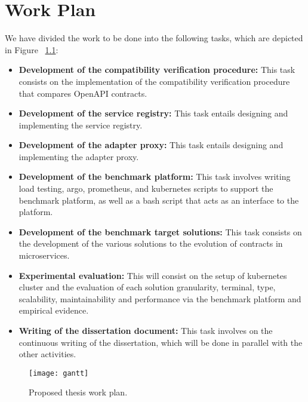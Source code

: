 
%

\chapter{Work Plan}
\label{cha:work_plan}

We have divided the work to be done into the following tasks, which are depicted in Figure ~\ref{fig:gantt}:

\begin{itemize}
    \item \textbf{Development of the compatibility verification procedure:} This task consists on the implementation of the compatibility verification procedure that compares OpenAPI contracts.
    \item \textbf{Development of the service registry:} This task entails designing and implementing the service registry.
    \item \textbf{Development of the adapter proxy:} This task entails designing and implementing the adapter proxy.
    \item \textbf{Development of the benchmark platform:} This task involves writing load testing, argo, prometheus, and kubernetes scripts to support the benchmark platform, as well as a bash script that acts as an interface to the platform.
    \item \textbf{Development of the benchmark target solutions:} This task consists on the development of the various solutions to the evolution of contracts in microservices.
    \item \textbf{Experimental evaluation:} This will consist on the setup of kubernetes cluster and the evaluation of each solution granularity, terminal, type, scalability, maintainability and performance via the benchmark platform and empirical evidence.
    \item \textbf{Writing of the dissertation document:} This task involves on the continuous writing of the dissertation, which
    will be done in parallel with the other activities.
\end{itemize}

\begin{figure}[htbp]
    \centering
    \texttt{[image: gantt]}
    \caption{Proposed thesis work plan.}
    \label{fig:gantt}
\end{figure}
